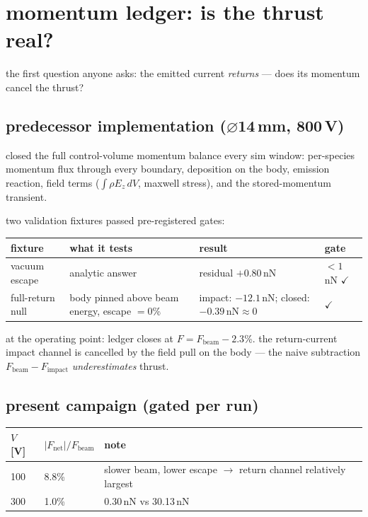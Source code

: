\documentclass[11pt]{article}
\begin{document}
\section{momentum ledger: is the thrust real?}

the first question anyone asks: the emitted current \emph{returns} --- does
its momentum cancel the thrust?

\subsection{predecessor implementation ($\varnothing$14\,mm, 800\,V)}

closed the full control-volume momentum balance every sim window: per-species
momentum flux through every boundary, deposition on the body, emission
reaction, field terms ($\int\rho E_z\,dV$, maxwell stress), and the
stored-momentum transient.

two validation fixtures passed pre-registered gates:

\begin{center}\small
\begin{tabular}{llll}
\toprule
fixture & what it tests & result & gate \\
\midrule
vacuum escape & analytic answer & residual $+0.80$\,nN &
  \textcolor{gpass}{$< 1$\,nN $\checkmark$} \\
full-return null & body pinned above beam energy, escape $= 0$\% &
  impact: $-12.1$\,nN; closed: $-0.39\,\text{nN} \approx 0$ &
  \textcolor{gpass}{$\checkmark$} \\
\bottomrule
\end{tabular}
\end{center}

at the operating point: ledger closes at $F = F_{\mathrm{beam}} - 2.3$\%.
the return-current impact channel is cancelled by the field pull on the body
--- the naive subtraction $F_{\mathrm{beam}} - F_{\mathrm{impact}}$
\emph{underestimates} thrust.

\subsection{present campaign (gated per run)}

\begin{center}\small
\begin{tabular}{lll}
\toprule
$V$ [V] & $|F_{\mathrm{net}}|/F_{\mathrm{beam}}$ & note \\
\midrule
100 & 8.8\% & slower beam, lower escape $\to$ return channel relatively
  largest \\
300 & 1.0\% & 0.30\,nN vs 30.13\,nN \\
\bottomrule
\end{tabular}
\end{center}
\end{document}
